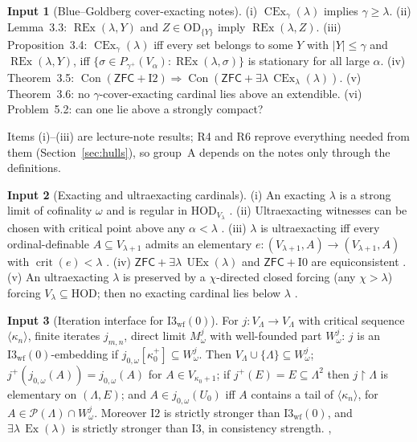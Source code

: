\documentclass[11pt,letterpaper]{article}
\theoremstyle{definition}
\newtheorem{inputthm}{Input}
\numberwithin{equation}{section}
\newcommand{\ZFC}{\mathsf{ZFC}}
\newcommand{\HOD}{\mathrm{HOD}}
\newcommand{\OD}{\mathrm{OD}}
\newcommand{\Ex}{\operatorname{Ex}}
\newcommand{\UEx}{\operatorname{UEx}}
\newcommand{\CEx}{\operatorname{CEx}}
\newcommand{\REx}{\operatorname{REx}}
\newcommand{\Con}{\operatorname{Con}}
\newcommand{\crit}{\operatorname{crit}}
\newcommand{\Pow}{\mathcal P}
\newcommand{\restr}{\mathbin{\upharpoonright}}
\newcommand{\Izero}{\mathrm{I0}}
\newcommand{\Itwo}{\mathrm{I2}}
\newcommand{\Ithree}{\mathrm{I3}}
\newcommand{\Iwf}{\mathrm{I3}_{\mathrm{wf}}(0)}
\newcommand{\R}[1]{\textsf{R#1}}
\begin{document}
\begin{inputthm}[Blue--Goldberg cover-exacting notes]\label{in:bg}
(i) $\CEx_\gamma(\lambda)$ implies $\gamma\ge\lambda$. (ii) Lemma~3.3: $\REx(\lambda,Y)$ and $Z\in\OD_{\{Y\}}$ imply $\REx(\lambda,Z)$. (iii) Proposition~3.4: $\CEx_\gamma(\lambda)$ iff every set belongs to some $Y$ with $|Y|\le\gamma$ and $\REx(\lambda,Y)$, iff $\{\sigma\in P_{\gamma^+}(V_\alpha):\REx(\lambda,\sigma)\}$ is stationary for all large $\alpha$. (iv) Theorem~3.5: $\Con(\ZFC+\Itwo)\Rightarrow\Con(\ZFC+\exists\lambda\,\CEx_\lambda(\lambda))$. (v) Theorem~3.6: no $\gamma$-cover-exacting cardinal lies above an extendible. (vi) Problem~5.2: can one lie above a strongly compact? \cite{cover}
\end{inputthm}

Items (i)--(iii) are lecture-note results; \R4 and \R6 reprove everything needed from them (Section~\ref{sec:hulls}), so group~A depends on the notes only through the definitions.

\begin{inputthm}[Exacting and ultraexacting cardinals]\label{in:abl}
(i) An exacting $\lambda$ is a strong limit of cofinality $\omega$ and is regular in $\HOD_{V_\lambda}$ \cite[Thm.~2.10]{abl}. (ii) Ultraexacting witnesses can be chosen with critical point above any $\alpha<\lambda$ \cite[Lemma~3.2]{abl}. (iii) $\lambda$ is ultraexacting iff every ordinal-definable $A\subseteq V_{\lambda+1}$ admits an elementary $e:(V_{\lambda+1},A)\to(V_{\lambda+1},A)$ with $\crit(e)<\lambda$ \cite[Thm.~B/3.1]{abgl}. (iv) $\ZFC+\exists\lambda\,\UEx(\lambda)$ and $\ZFC+\Izero$ are equiconsistent \cite[Thm.~A/4.5]{abgl}. (v) An ultraexacting $\lambda$ is preserved by a $\chi$-directed closed forcing (any $\chi>\lambda$) forcing $V_\lambda\subseteq\HOD$; then no exacting cardinal lies below $\lambda$ \cite[Prop.~3.9, Cor.~3.10]{abgl}.
\end{inputthm}

\begin{inputthm}[Iteration interface for $\Iwf$]\label{in:iter}
For $j:V_\Lambda\to V_\Lambda$ with critical sequence $\langle\kappa_n\rangle$, finite iterates $j_{m,n}$, direct limit $M^j_\omega$ with well-founded part $W^j_\omega$: $j$ is an $\Iwf$-embedding if $j_{0,\omega}[\kappa_0^+]\subseteq W^j_\omega$. Then $V_\Lambda\cup\{\Lambda\}\subseteq W^j_\omega$; $j^+(j_{0,\omega}(A))=j_{0,\omega}(A)$ for $A\in V_{\kappa_0+1}$; if $j^+(E)=E\subseteq\Lambda^2$ then $j\restr\Lambda$ is elementary on $(\Lambda,E)$; and $A\in j_{0,\omega}(U_0)$ iff $A$ contains a tail of $\langle\kappa_n\rangle$, for $A\in\Pow(\Lambda)\cap W^j_\omega$. Moreover $\Itwo$ is strictly stronger than $\Iwf$, and $\exists\lambda\,\Ex(\lambda)$ is strictly stronger than $\Ithree$, in consistency strength. \cite[\S3]{ad}, \cite[Prop.~5.1, Def.~5.2, Thm.~5.4, 5.10, Cor.~5.11]{abgl}
\end{inputthm}
\end{document}
